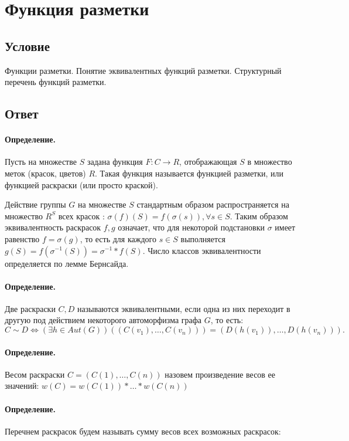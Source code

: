 \documentclass{report}
\begin{document}
\newpage

\section{Функция разметки}
\subsection{Условие}
Функции разметки. Понятие эквивалентных функций разметки. Структурный перечень
функций разметки.

\subsection{Ответ}
\paragraph*{Определение.}
Пусть на множестве $S$ задана функция  $F: C \to R$, отображающая $S$ в
множество меток (красок, цветов)  $R$. Такая функция называется функцией разметки,
или функцией раскраски (или просто краской).

\medskip

Действие группы  $G$ на множестве  $S$ стандартным образом распространяется
на множество  $R^{S}$ всех красок : $\sigma(f)(S) = f(\sigma(s)), \forall s \in S$.
Таким образом эквивалентность раскрасок $f,g$ означает, что для некоторой
подстановки  $\sigma$ имеет равенство  $f = \sigma(g)$, то есть
для каждого $s \in S$ выполняется $g(S) = f(\sigma^{-1}(S)) = \sigma^{-1}*f(S)$. Число
классов эквивалентности определяется по лемме Бернсайда.

\paragraph*{Определение.}
Две раскраски $C, D$ называются эквивалентными, если одна из них переходит в другую
под действием некоторого автоморфизма графа  $G$, то есть:
 \[
C \sim D \iff (\exists h \in Aut(G))((C(v_1), \ldots, C(v_{n}))) = 
(D(h(v_1)), \ldots, D(h(v_{n}))).
\] 

\paragraph*{Определение.}
Весом раскраски $C = (C(1), \ldots, C(n))$ назовем произведение весов ее значений:
$w(C) = w(C(1)) * \ldots * w(C(n))$

\paragraph*{Определение.}
Перечнем раскрасок будем называть сумму весов всех возможных раскрасок:
\end{document}
